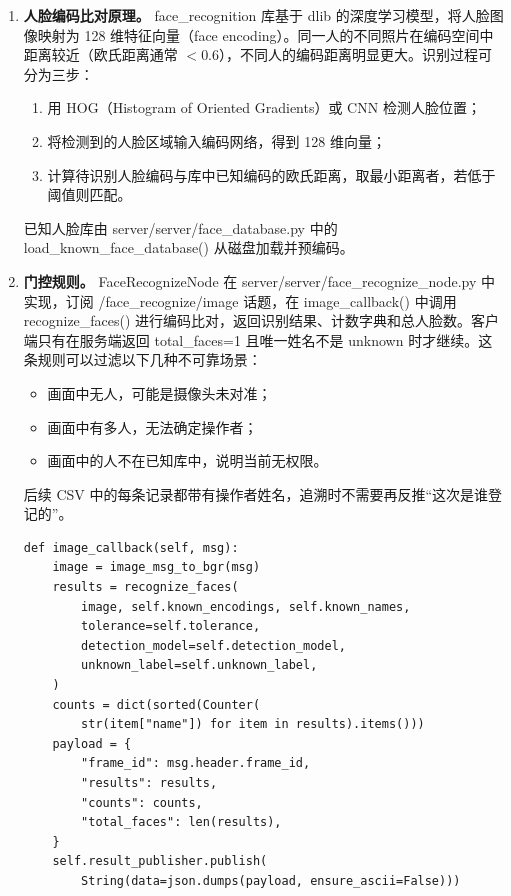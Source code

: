 \documentclass[12pt]{article}
\newcommand{\code}[1]{{\ttfamily #1}}
\begin{document}
\begin{enumerate}
	\item \textbf{人脸编码比对原理。} \code{face\_recognition} 库基于 dlib 的深度学习模型，将人脸图像映射为 128 维特征向量（face encoding）。同一人的不同照片在编码空间中距离较近（欧氏距离通常 $< 0.6$），不同人的编码距离明显更大。识别过程可分为三步：

	      \begin{enumerate}
		      \item 用 HOG（Histogram of Oriented Gradients）或 CNN 检测人脸位置；
		      \item 将检测到的人脸区域输入编码网络，得到 128 维向量；
		      \item 计算待识别人脸编码与库中已知编码的欧氏距离，取最小距离者，若低于阈值则匹配。
	      \end{enumerate}

	      已知人脸库由 \code{server/server/face\_database.py} 中的 \code{load\_known\_face\_database()} 从磁盘加载并预编码。

	\item \textbf{门控规则。} \code{FaceRecognizeNode} 在 \code{server/server/face\_recognize\_node.py} 中实现，订阅 \code{/face\_recognize/image} 话题，在 \code{image\_callback()} 中调用 \code{recognize\_faces()} 进行编码比对，返回识别结果、计数字典和总人脸数。客户端只有在服务端返回 \code{total\_faces=1} 且唯一姓名不是 \code{unknown} 时才继续。这条规则可以过滤以下几种不可靠场景：

	      \begin{itemize}
		      \item 画面中无人，可能是摄像头未对准；
		      \item 画面中有多人，无法确定操作者；
		      \item 画面中的人不在已知库中，说明当前无权限。
	      \end{itemize}

	      后续 CSV 中的每条记录都带有操作者姓名，追溯时不需要再反推“这次是谁登记的”。

	      \begin{lstlisting}[caption={人脸识别节点回调逻辑（\code{face\_recognize\_node.py}）},label={lst:face-recognize}]
def image_callback(self, msg):
    image = image_msg_to_bgr(msg)
    results = recognize_faces(
        image, self.known_encodings, self.known_names,
        tolerance=self.tolerance,
        detection_model=self.detection_model,
        unknown_label=self.unknown_label,
    )
    counts = dict(sorted(Counter(
        str(item["name"]) for item in results).items()))
    payload = {
        "frame_id": msg.header.frame_id,
        "results": results,
        "counts": counts,
        "total_faces": len(results),
    }
    self.result_publisher.publish(
        String(data=json.dumps(payload, ensure_ascii=False)))
\end{lstlisting}
\end{enumerate}
\end{document}
